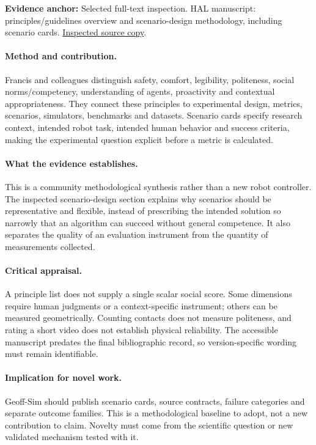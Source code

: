 \textbf{Evidence anchor:} Selected full-text inspection. HAL manuscript: principles/guidelines overview and scenario-design methodology, including scenario cards. \href{https://hal.science/hal-04164243/document}{Inspected source copy}.

\paragraph{Method and contribution.} Francis and colleagues distinguish safety, comfort, legibility, politeness, social norms/competency, understanding of agents, proactivity and contextual appropriateness. They connect these principles to experimental design, metrics, scenarios, simulators, benchmarks and datasets. Scenario cards specify research context, intended robot task, intended human behavior and success criteria, making the experimental question explicit before a metric is calculated.

\paragraph{What the evidence establishes.} This is a community methodological synthesis rather than a new robot controller. The inspected scenario-design section explains why scenarios should be representative and flexible, instead of prescribing the intended solution so narrowly that an algorithm can succeed without general competence. It also separates the quality of an evaluation instrument from the quantity of measurements collected.

\paragraph{Critical appraisal.} A principle list does not supply a single scalar social score. Some dimensions require human judgments or a context-specific instrument; others can be measured geometrically. Counting contacts does not measure politeness, and rating a short video does not establish physical reliability. The accessible manuscript predates the final bibliographic record, so version-specific wording must remain identifiable.

\paragraph{Implication for novel work.} Geoff-Sim should publish scenario cards, source contracts, failure categories and separate outcome families. This is a methodological baseline to adopt, not a new contribution to claim. Novelty must come from the scientific question or new validated mechanism tested with it.

